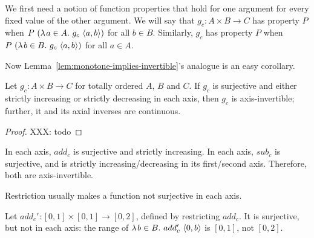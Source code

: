 We first need a notion of function properties that hold for one argument for every fixed value of the other argument.
We will say that $g_c : A \times B \to C$ has property $P$  when $P~(\lambda\mspace{2mu}{a \in A}\ldotp\, g_c~\langle{a,b}\rangle)$ for all $b \in B$.
Similarly, $g_c$ has property $P$  when $P~(\lambda\mspace{2mu}{b \in B}\ldotp\, g_c~\langle{a,b}\rangle)$ for all $a \in A$.

Now Lemma~\ref{lem:monotone-implies-invertible}'s analogue is an easy corollary.

\begin{theorem}
\label{thm:uniformly-monotone-implies-invertible}
Let $g_c : A \times B \to C$ for totally ordered $A$, $B$ and $C$.
If $g_c$ is surjective and either strictly increasing or strictly decreasing in each axis, then $g_c$ is axis-invertible; further, it and its axial inverses are continuous.
\end{theorem}
\begin{proof}
XXX: todo
\end{proof}

\begin{example}
In each axis, $add_c$ is surjective and strictly increasing.
In each axis, $sub_c$ is surjective, and is strictly increasing/decreasing in its first/second axis.
Therefore, both are axis-invertible.
\exampleqed
\end{example}

Restriction usually makes a function not surjective in each axis.

\begin{example}
Let $add_c' : [0,1] \times [0,1] \to [0,2]$, defined by restricting $add_c$.
It is surjective, but not in each axis: the range of $\lambda\mspace{2mu}{b \in B}\ldotp\, add_c'~\langle{0,b}\rangle$ is $[0,1]$, not $[0,2]$.
\exampleqed
\end{example}

